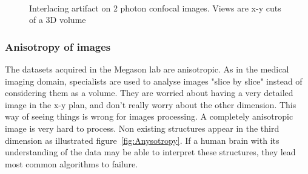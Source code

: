\begin{figure}[htb]
  \centering
  \\
  \caption{Interlacing artifact on 2 photon confocal images. Views are x-y cuts of a 3D volume}
  \label{fig:InterlacingArtefact}
\end{figure}



\subsubsection{Anisotropy of images}


The datasets acquired in the Megason lab are anisotropic. As in the medical imaging domain, specialists are used to analyse images "slice by slice"
instead of considering them as a volume. They are worried about having a very detailed image in the x-y plan, and don't really worry about the other dimension.
This way of seeing things is wrong for images processing. A completely anisotropic image is very hard to process.
Non existing structures appear in the third dimension as illustrated figure~\ref{fig:Anysotropy}.
If a human brain with its understanding of the data may be able to interpret these structures, they lead most common algorithms to failure.

